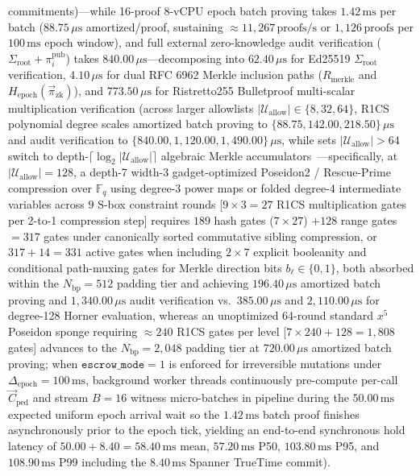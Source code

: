 \documentclass[conference,10pt]{IEEEtran}
\begin{document}
commitments)---while 16-proof 8-vCPU epoch batch proving takes $1.42\,\text{ms}$ per batch ($88.75\,\mu\text{s}$ amortized/proof, sustaining $\approx 11{,}267\,\text{proofs/s}$ or $1{,}126\,\text{proofs}$ per $100\,\text{ms}$ epoch window), and full external zero-knowledge audit verification ($\Sigma_{\text{root}} + \pi_i^{\text{pub}}$) takes $840.00\,\mu\text{s}$---decomposing into $62.40\,\mu\text{s}$ for Ed25519 $\Sigma_{\text{root}}$ verification, $4.10\,\mu\text{s}$ for dual RFC 6962 Merkle inclusion paths ($R_{\text{merkle}}$ and $H_{\text{epoch}}(\vec{\pi}_{\text{zk}})$), and $773.50\,\mu\text{s}$ for Ristretto255 Bulletproof multi-scalar multiplication verification (across larger allowlists $|\mathcal{U}_{\text{allow}}| \in \{8, 32, 64\}$, R1CS polynomial degree scales amortized batch proving to $\{88.75, 142.00, 218.50\}\,\mu\text{s}$ and audit verification to $\{840.00, 1{,}120.00, 1{,}490.00\}\,\mu\text{s}$, while sets $|\mathcal{U}_{\text{allow}}| > 64$ switch to depth-$\lceil \log_2 |\mathcal{U}_{\text{allow}}| \rceil$ algebraic Merkle accumulators~\cite{grassi2021poseidon}---specifically, at $|\mathcal{U}_{\text{allow}}| = 128$, a depth-7 width-3 gadget-optimized Poseidon2 / Rescue-Prime compression over $\mathbb{F}_q$ using degree-3 power maps or folded degree-4 intermediate variables across $9$ S-box constraint rounds [$9 \times 3 = 27$ R1CS multiplication gates per 2-to-1 compression step] requires $189$ hash gates ($7 \times 27$) $+ 128$ range gates $= 317$ gates under canonically sorted commutative sibling compression, or $317 + 14 = 331$ active gates when including $2 \times 7$ explicit booleanity and conditional path-muxing gates for Merkle direction bits $b_{\ell} \in \{0,1\}$, both absorbed within the $N_{\text{bp}} = 512$ padding tier and achieving $196.40\,\mu\text{s}$ amortized batch proving and $1{,}340.00\,\mu\text{s}$ audit verification vs.\ $385.00\,\mu\text{s}$ and $2{,}110.00\,\mu\text{s}$ for degree-128 Horner evaluation, whereas an unoptimized 64-round standard $x^5$ Poseidon sponge requiring $\approx 240$ R1CS gates per level [$7 \times 240 + 128 = 1{,}808$ gates] advances to the $N_{\text{bp}} = 2{,}048$ padding tier at $720.00\,\mu\text{s}$ amortized batch proving; when $\texttt{escrow\_mode} = 1$ is enforced for irreversible mutations under $\Delta_{\text{epoch}} = 100\,\text{ms}$, background worker threads continuously pre-compute per-call $\vec{C}_{\text{ped}}$ and stream $B=16$ witness micro-batches in pipeline during the $50.00\,\text{ms}$ expected uniform epoch arrival wait so the $1.42\,\text{ms}$ batch proof finishes asynchronously prior to the epoch tick, yielding an end-to-end synchronous hold latency of $50.00 + 8.40 = 58.40\,\text{ms}$ mean, $57.20\,\text{ms}$ P50, $103.80\,\text{ms}$ P95, and $108.90\,\text{ms}$ P99 including the $8.40\,\text{ms}$ Spanner TrueTime commit).
\end{document}
